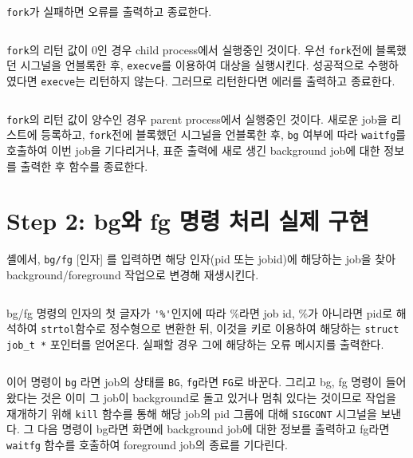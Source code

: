\documentclass{report}
\begin{document}
\inputminted[firstline=197,lastline=199, linenos]{C}{../shlab/tsh.c}
\lstinline{fork}가 실패하면 오류를 출력하고 종료한다.

\inputminted[firstline=200,lastline=215, linenos]{C}{../shlab/tsh.c}
\lstinline{fork}의 리턴 값이 0인 경우 child process에서 실행중인 것이다. 우선 \lstinline{fork}전에 블록했던 시그널을 언블록한 후, \lstinline{execve}를 이용하여 대상을 실행시킨다. 성공적으로 수행하였다면 \lstinline{execve}는 리턴하지 않는다. 그러므로 리턴한다면 에러를 출력하고 종료한다.

\inputminted[firstline=216,lastline=230, linenos]{C}{../shlab/tsh.c}
\lstinline{fork}의 리턴 값이 양수인 경우 parent process에서 실행중인 것이다. 새로운 job을 리스트에 등록하고, \lstinline{fork}전에 블록했던 시그널을 언블록한 후, \lstinline{bg} 여부에 따라 \lstinline{waitfg}를 호출하여 이번 job을 기다리거나, 표준 출력에 새로 생긴 background job에 대한 정보를 출력한 후 함수를 종료한다.

\section{Step 2: bg와 fg 명령 처리 실제 구현}
셸에서, \lstinline{bg/fg} [인자] 를 입력하면 해당 인자(pid 또는 jobid)에 해당하는 job을 찾아 background/foreground 작업으로 변경해 재생시킨다.
\inputminted[firstline=311,lastline=346, linenos]{C}{../shlab/tsh.c}
bg/fg 명령의 인자의 첫 글자가 \lstinline{'%'}인지에 따라 \%라면 job id, \%가 아니라면 pid로 해석하여 \lstinline{strtol}함수로 정수형으로 변환한 뒤, 이것을 키로 이용하여 해당하는 \lstinline{struct job_t *} 포인터를 얻어온다. 실패할 경우 그에 해당하는 오류 메시지를 출력한다.

\inputminted[firstline=347,lastline=368, linenos]{C}{../shlab/tsh.c}
이어 명령이 \lstinline{bg} 라면 job의 상태를 \lstinline{BG}, \lstinline{fg}라면 \lstinline{FG}로 바꾼다. 그리고 bg, fg 명령이 들어왔다는 것은 이미 그 job이 background로 돌고 있거나 멈춰 있다는 것이므로 작업을 재개하기 위해 \lstinline{kill} 함수를 통해 해당 job의 pid 그룹에 대해 \lstinline{SIGCONT} 시그널을 보낸다. 그 다음 명령이 bg라면 화면에 background job에 대한 정보를 출력하고 fg라면 \lstinline{waitfg} 함수를 호출하여 foreground job의 종료를 기다린다.
\end{document}

